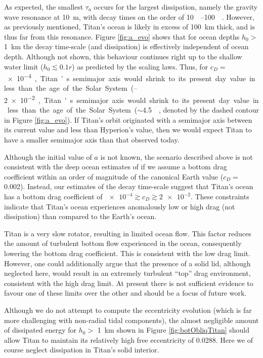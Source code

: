As expected, the smallest $\tau_a$ occurs for the largest dissipation, namely the gravity wave resonance at \SI{10}{\metre}, with decay times on the order of \SIrange{10}{100}{\mega\year}. However, as previously mentioned, Titan's ocean is likely in excess of \SI{100}{\kilo\metre} thick, and is thus far from this resonance. Figure \ref{fig:a_evo} shows that for ocean depths $h_0 >$ \SI{1}{\kilo\metre} the decay time-scale (and dissipation) is effectively independent of ocean depth. Although not shown, this behaviour continues right up to the shallow water limit ($h_0 \lesssim 0.1r$) as predicted by the \citet{chen2013tidal} scaling laws. Thus, for $c_D =$ \SIrange{e-4}{2e-2}, Titan's semimajor axis would shrink to its present day value in less than the age of the Solar System ($\sim$\SI{4.5}{\giga\year}, denoted by the dashed contour in Figure \ref{fig:a_evo}). If Titan's orbit originated with a semimajor axis between its current value and less than Hyperion's value, then we would expect Titan to have a smaller semimajor axis than that observed today.

Although the initial value of $a$ is not known, the scenario described above is not consistent with the deep ocean estimates of \citet{sohl2014structural, baland2014titan} if we assume a bottom drag coefficient within an order of magnitude of the canonical Earth value ($c_D =$ \num{0.002}). Instead, our estimates of the decay time-scale suggest that Titan's ocean has a bottom drag coefficient of \hbox{$ \num{e-4} \gtrsim c_D \gtrsim \num{2e-2} $}. These constraints indicate that Titan's ocean experiences anomalously low or high drag (not dissipation) than compared to the Earth's ocean.

Titan is a very slow rotator, resulting in limited ocean flow. This factor reduces the amount of turbulent bottom flow experienced in the ocean, consequently lowering the bottom drag coefficient. This is consistent with the low drag limit. However, one could additionally argue that the presence of a solid lid, although neglected here, would result in an extremely turbulent ``top'' drag environment, consistent with the high drag limit. At present there is not sufficient evidence to favour one of these limits over the other and should be a focus of future work.  

Although we do not attempt to compute the eccentricity evolution (which is far more challenging with non-radial tidal components), the almost negligible amount of dissipated energy for $h_0 >$ \SI{1}{\kilo\metre} shown in Figure \ref{fig:botObliqTitan} should allow Titan to maintain its relatively high free eccentricity of 0.0288. Here we of course neglect dissipation in Titan's solid interior.